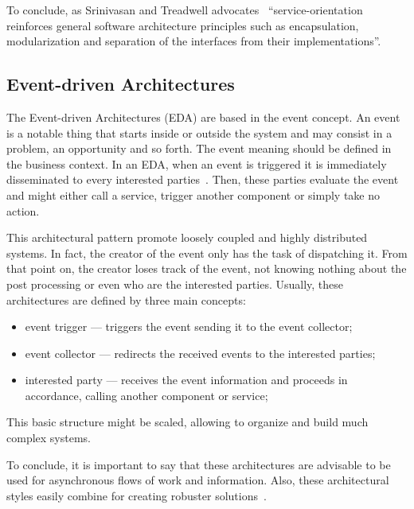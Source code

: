 To conclude, as Srinivasan and Treadwell advocates~\citep{Srinivasan2005} ``service-orientation reinforces general software architecture principles such as encapsulation, modularization and separation of the interfaces from their implementations''.




\subsection{Event-driven Architectures}\label{sec:eda}

The Event-driven Architectures (EDA) are based in the event concept. An event~\citep{Michelson2006} is a notable thing that starts inside or outside the system and may consist in a problem, an opportunity and so forth. The event meaning should be defined in the business context. In an EDA, when an event is triggered it is immediately disseminated to every interested parties~\citep{Qin2008}. Then, these parties evaluate the event and might either call a service, trigger another component or simply take no action.

This architectural pattern promote loosely coupled and highly distributed systems. In fact, the creator of the event only has the task of dispatching it. From that point on, the creator loses track of the event, not knowing nothing about the post processing or even who are the interested parties. Usually, these architectures are defined by three main concepts:
\begin{itemize}
\item event trigger --- triggers the event sending it to the event collector;
\item event collector --- redirects the received events to the interested parties;
\item interested party --- receives the event information and proceeds in accordance, calling another component or service;
\end{itemize}

This basic structure might be scaled, allowing to organize and build much complex systems.

To conclude, it is important to say that these architectures are advisable to be used for asynchronous flows of work and information. Also, these architectural styles easily combine for creating robuster solutions~\citep{Marechaux2006,Laliwala2008}.

